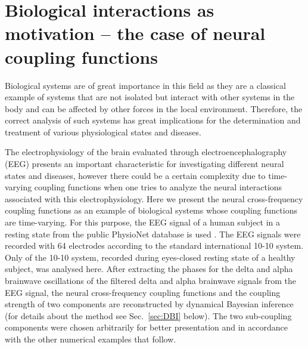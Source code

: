 \documentclass[pre,aps,twocolumn,showpacs]{revtex4}
\newcommand{\red}[1]{{\color{red}{#1}}}
\begin{document}
%









\section{Biological interactions as motivation -- the case of neural coupling functions}\label{sec:EEG}

Biological systems are of great importance in this field as they are a classical example of systems that are not isolated but interact with other systems in the body and can be affected by other forces in the local environment. Therefore, the correct analysis of such systems has great implications for the determination and treatment of various physiological states and diseases.



The electrophysiology of the brain evaluated through electroencephalography (EEG) presents an important characteristic for investigating different neural states and diseases, however there could be a certain complexity due to time-varying coupling functions when one tries to analyze the neural interactions associated with this electrophysiology. Here we present the neural cross-frequency coupling functions \cite{Stankovski:15a} as an example of biological systems whose coupling functions are time-varying. For this purpose, the EEG signal of a human subject in a resting state from the public PhysioNet database is used \cite{Goldberger:00,physionetlink,Schalk:04}. The EEG signals were recorded with 64 electrodes according to the standard international 10-10 system. Only \red{one EEG signal recorded at the frontal Fp1 electrode} of the 10-10 system, recorded during eyes-closed resting state of a healthy subject, was analysed here.  After extracting the phases for the delta and alpha brainwave oscillations of the filtered delta and alpha brainwave signals from the EEG signal, the neural cross-frequency coupling functions and the coupling strength of two components are reconstructed by dynamical Bayesian inference (for details about the method see Sec.\ \ref{sec:DBI} below). The two sub-coupling components were chosen arbitrarily for better presentation and in accordance with the other numerical examples that follow.
\end{document}

